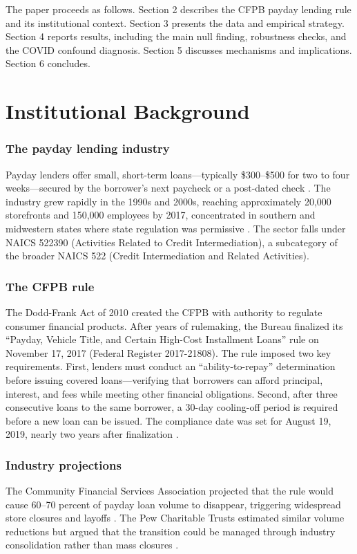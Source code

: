 \documentclass[12pt]{article}
\begin{document}
The paper proceeds as follows. Section 2 describes the CFPB payday lending rule and its institutional context. Section 3 presents the data and empirical strategy. Section 4 reports results, including the main null finding, robustness checks, and the COVID confound diagnosis. Section 5 discusses mechanisms and implications. Section 6 concludes.


\section{Institutional Background}

\subsubsection*{The payday lending industry} Payday lenders offer small, short-term loans---typically \$300--\$500 for two to four weeks---secured by the borrower's next paycheck or a post-dated check \citep{stegman2007}. The industry grew rapidly in the 1990s and 2000s, reaching approximately 20,000 storefronts and 150,000 employees by 2017, concentrated in southern and midwestern states where state regulation was permissive \citep{graves2003, avery2011}. The sector falls under NAICS 522390 (Activities Related to Credit Intermediation), a subcategory of the broader NAICS 522 (Credit Intermediation and Related Activities).

\subsubsection*{The CFPB rule} The Dodd-Frank Act of 2010 created the CFPB with authority to regulate consumer financial products. After years of rulemaking, the Bureau finalized its ``Payday, Vehicle Title, and Certain High-Cost Installment Loans'' rule on November 17, 2017 (Federal Register 2017-21808). The rule imposed two key requirements. First, lenders must conduct an ``ability-to-repay'' determination before issuing covered loans---verifying that borrowers can afford principal, interest, and fees while meeting other financial obligations. Second, after three consecutive loans to the same borrower, a 30-day cooling-off period is required before a new loan can be issued. The compliance date was set for August 19, 2019, nearly two years after finalization \citep{cfpb2017}.

\subsubsection*{Industry projections} The Community Financial Services Association projected that the rule would cause 60--70 percent of payday loan volume to disappear, triggering widespread store closures and layoffs \citep{cfsa2017}. The Pew Charitable Trusts estimated similar volume reductions but argued that the transition could be managed through industry consolidation rather than mass closures \citep{pew2017}.
\end{document}
